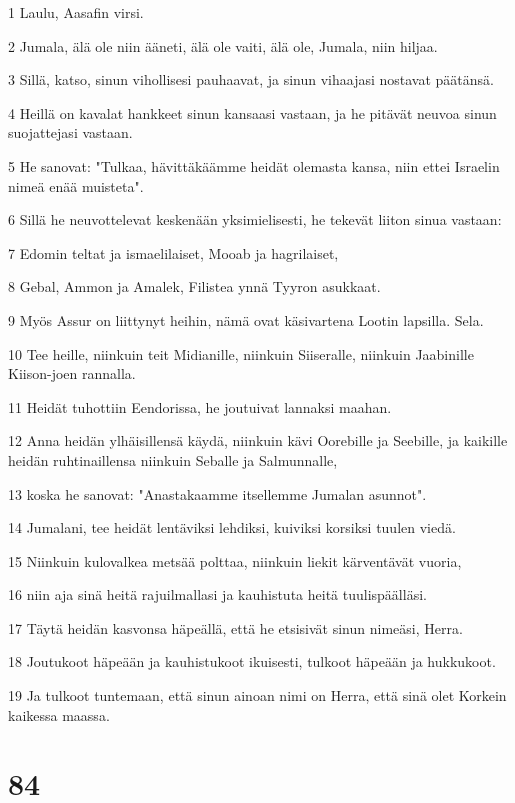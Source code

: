 \par 1 Laulu, Aasafin virsi.
\par 2 Jumala, älä ole niin ääneti, älä ole vaiti, älä ole, Jumala, niin hiljaa.
\par 3 Sillä, katso, sinun vihollisesi pauhaavat, ja sinun vihaajasi nostavat päätänsä.
\par 4 Heillä on kavalat hankkeet sinun kansaasi vastaan, ja he pitävät neuvoa sinun suojattejasi vastaan.
\par 5 He sanovat: "Tulkaa, hävittäkäämme heidät olemasta kansa, niin ettei Israelin nimeä enää muisteta".
\par 6 Sillä he neuvottelevat keskenään yksimielisesti, he tekevät liiton sinua vastaan:
\par 7 Edomin teltat ja ismaelilaiset, Mooab ja hagrilaiset,
\par 8 Gebal, Ammon ja Amalek, Filistea ynnä Tyyron asukkaat.
\par 9 Myös Assur on liittynyt heihin, nämä ovat käsivartena Lootin lapsilla. Sela.
\par 10 Tee heille, niinkuin teit Midianille, niinkuin Siiseralle, niinkuin Jaabinille Kiison-joen rannalla.
\par 11 Heidät tuhottiin Eendorissa, he joutuivat lannaksi maahan.
\par 12 Anna heidän ylhäisillensä käydä, niinkuin kävi Oorebille ja Seebille, ja kaikille heidän ruhtinaillensa niinkuin Seballe ja Salmunnalle,
\par 13 koska he sanovat: "Anastakaamme itsellemme Jumalan asunnot".
\par 14 Jumalani, tee heidät lentäviksi lehdiksi, kuiviksi korsiksi tuulen viedä.
\par 15 Niinkuin kulovalkea metsää polttaa, niinkuin liekit kärventävät vuoria,
\par 16 niin aja sinä heitä rajuilmallasi ja kauhistuta heitä tuulispäälläsi.
\par 17 Täytä heidän kasvonsa häpeällä, että he etsisivät sinun nimeäsi, Herra.
\par 18 Joutukoot häpeään ja kauhistukoot ikuisesti, tulkoot häpeään ja hukkukoot.
\par 19 Ja tulkoot tuntemaan, että sinun ainoan nimi on Herra, että sinä olet Korkein kaikessa maassa.

\chapter{84}

